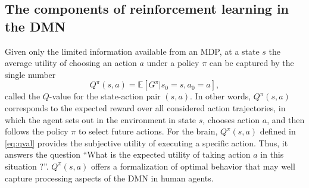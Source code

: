 \documentclass[10pt,letterpaper]{article}
\def\V{\mathbf{V}}
\begin{document}
\subsection{The components of reinforcement learning in the DMN}
Given only the limited information available from an MDP, at a state $s$ the average
utility of choosing an action $a$ under a policy $\pi$ can be captured by the single number
\begin{equation}
  \label{eq:qval}
  Q^{\pi}(s,a) = \mathbb E [G^\pi|s_0=s,a_0=a],
\end{equation}
called the $Q$-value for the state-action pair $(s,a)$.
In other words, $Q^{\pi}(s,a)$ corresponds to the expected reward
over all considered action trajectories, in which
the agent sets out in the environment in state
$s$, chooses action $a$, and then follows the policy $\pi$ to select future actions.
For the brain,
$Q^{\pi}(s, a)$ defined in \eqref{eq:qval} provides the subjective
utility of executing a specific action.
Thus, it answers the question
``What is the expected utility of taking action $a$ in this situation ?''.
$Q^{\pi}(s,a)$ offers a formalization of optimal behavior that
may well capture processing aspects of the DMN in human agents.



\end{document}
